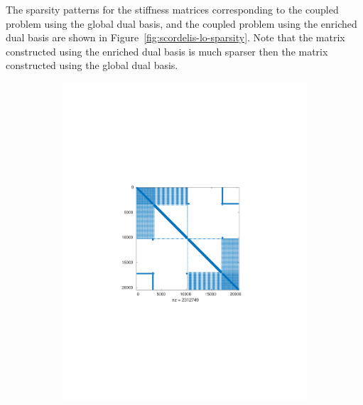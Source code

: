 The sparsity patterns for the stiffness matrices corresponding to the coupled problem using the global dual basis, and the coupled problem using the enriched \Bezier dual basis are shown in Figure~\ref{fig:scordelis-lo-sparsity}. Note that the matrix constructed using the enriched \Bezier dual basis is much sparser then the matrix constructed using the global dual basis.\par

\begin{figure}[h]
	\centering
	\captionsetup[subfigure]{font = footnotesize}
	\begin{subfigure}[b]{.48\textwidth}
		\centering
		\includegraphics[clip, trim=5cm 8.5cm 5cm 9cm, width = .9\textwidth]{global_sparsity}
		\caption{}
	\end{subfigure}\hfil
	\begin{subfigure}[b]{.48\textwidth}
		\centering

\end{subfigure}
\end{figure}
